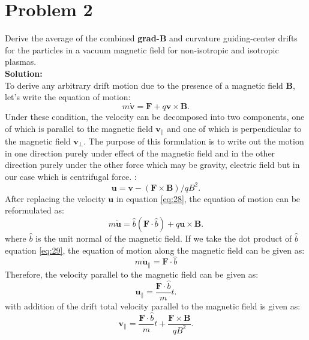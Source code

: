 \documentclass[11pt]{amsart}
\begin{document}
 \section*{Problem 2 }
Derive the average of the combined \textbf{grad-B} and curvature guiding-center drifts for the particles in a vacuum magnetic field for non-isotropic and isotropic plasmas.
\\
\textbf{Solution:}\\
To derive any arbitrary drift motion due to the presence of a magnetic field $\mathbf{B}$, let's write the equation of motion:
\begin{equation}
\label{eq:27}
m\dot{\mathbf{v}}=\mathbf{F}+q\mathbf{v}\times \mathbf{B}.
\end{equation}
Under these condition, the velocity can be decomposed into two components, one of which is parallel to  the magnetic field $\mathbf{v}_{\parallel}$ and one of which is perpendicular to the magnetic field $\mathbf{v}_{\perp}$. The purpose of this formulation is to write out the motion in one direction purely under effect of the magnetic field and in the other direction purely under the other force which may be gravity, electric field but in our case which is centrifugal force. :
\begin{equation}
\label{eq:28}
\mathbf{u}=\mathbf{v}-(\mathbf{F}\times\mathbf{B})/q B^2.
\end{equation}
After replacing the velocity $\mathbf{u}$ in equation \ref{eq:28}, the equation of motion can be reformulated as:
\begin{equation}
\label{eq:29}
m \dot{\mathbf{u}}=\hat{b}(\mathbf{F}\cdot \hat{b})+q\mathbf{u}\times\mathbf{B}.
\end{equation}
where $\hat{b}$ is the unit normal of the magnetic field. If we take the dot product of $\hat{b}$ equation \ref{eq:29}, the equation of motion along the magnetic field can be given as:
\begin{equation}
\label{eq:30}
m \dot{\mathbf{u}}_{\parallel}=\mathbf{F}\cdot \hat{b}
\end{equation}
Therefore, the velocity parallel to the magnetic field can be given as:
\begin{equation}
\label{eq:31}
\mathbf{u}_{\parallel}=\frac{\mathbf{F}\cdot \hat{b}}{m}t.
\end{equation}
with addition of the drift total velocity parallel to the magnetic field is given as:
\begin{equation}
\label{eq:32}
\mathbf{v}_{\parallel}=\frac{\mathbf{F}\cdot \hat{b}}{m}t+\frac{\mathbf{F}\times\mathbf{B}}{q B^2}.
\end{equation}
\end{document}
